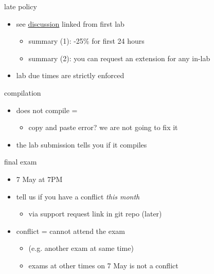 \begin{frame}{late policy}
    \begin{itemize}
    \item see \href{https://markfloryan.github.io/pdr/uva/labduedates.html}{discussion} linked from first lab
        \begin{itemize}
            \item summary (1): -25\% for first 24 hours
            \item summary (2): you can request an extension for any in-lab
        \end{itemize}
        \vspace{.5cm}
    \item lab due times are strictly enforced
    \end{itemize}
\end{frame}

\begin{frame}{compilation}
    \begin{itemize}
    \item does not compile = 
        \begin{itemize}
        \item copy and paste error? we are not going to fix it
        \end{itemize}
    \vspace{.5cm}
    \item the lab submission tells you if it compiles
    \end{itemize}
\end{frame}

\begin{frame}{final exam}
    \begin{itemize}
    \item 7 May at 7PM
    \item tell us if you have a conflict \textit{this month}
        \begin{itemize}
        \item via support request link in git repo (later)
        \end{itemize}
    \item conflict = cannot attend the exam
        \begin{itemize}
        \item (e.g. another exam at same time)
        \item exams at other times on 7 May is not a conflict
        \end{itemize}
    \end{itemize}
\end{frame}
